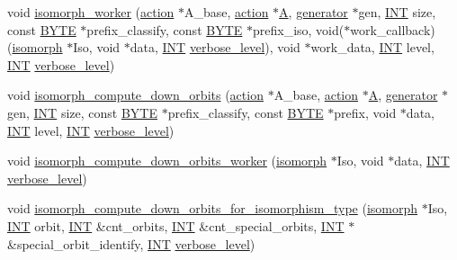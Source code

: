 \begin{DoxyCompactItemize}
void \mbox{\hyperlink{isomorph__global_8_c_ace3bb6ec719b02a35534309d4d3fe99a}{isomorph\+\_\+worker}} (\mbox{\hyperlink{classaction}{action}} $\ast$A\+\_\+base, \mbox{\hyperlink{classaction}{action}} $\ast$\mbox{\hyperlink{simeon_8_c_a97833f04c3a9c008df5521a2fc291bb4}{A}}, \mbox{\hyperlink{classgenerator}{generator}} $\ast$gen, \mbox{\hyperlink{galois_8h_a09fddde158a3a20bd2dcadb609de11dc}{I\+NT}} size, const \mbox{\hyperlink{galois_8h_ab6cc7b4aeb6ea31aba2b3fbfc83ff5e6}{B\+Y\+TE}} $\ast$prefix\+\_\+classify, const \mbox{\hyperlink{galois_8h_ab6cc7b4aeb6ea31aba2b3fbfc83ff5e6}{B\+Y\+TE}} $\ast$prefix\+\_\+iso, void($\ast$work\+\_\+callback)(\mbox{\hyperlink{classisomorph}{isomorph}} $\ast$Iso, void $\ast$data, \mbox{\hyperlink{galois_8h_a09fddde158a3a20bd2dcadb609de11dc}{I\+NT}} \mbox{\hyperlink{simeon_8_c_a818073fbcc2f439e7c56952f67386122}{verbose\+\_\+level}}), void $\ast$work\+\_\+data, \mbox{\hyperlink{galois_8h_a09fddde158a3a20bd2dcadb609de11dc}{I\+NT}} level, \mbox{\hyperlink{galois_8h_a09fddde158a3a20bd2dcadb609de11dc}{I\+NT}} \mbox{\hyperlink{simeon_8_c_a818073fbcc2f439e7c56952f67386122}{verbose\+\_\+level}})
\item 
void \mbox{\hyperlink{isomorph__global_8_c_a3613cea19158edd30958c4edecd97d53}{isomorph\+\_\+compute\+\_\+down\+\_\+orbits}} (\mbox{\hyperlink{classaction}{action}} $\ast$A\+\_\+base, \mbox{\hyperlink{classaction}{action}} $\ast$\mbox{\hyperlink{simeon_8_c_a97833f04c3a9c008df5521a2fc291bb4}{A}}, \mbox{\hyperlink{classgenerator}{generator}} $\ast$gen, \mbox{\hyperlink{galois_8h_a09fddde158a3a20bd2dcadb609de11dc}{I\+NT}} size, const \mbox{\hyperlink{galois_8h_ab6cc7b4aeb6ea31aba2b3fbfc83ff5e6}{B\+Y\+TE}} $\ast$prefix\+\_\+classify, const \mbox{\hyperlink{galois_8h_ab6cc7b4aeb6ea31aba2b3fbfc83ff5e6}{B\+Y\+TE}} $\ast$prefix, void $\ast$data, \mbox{\hyperlink{galois_8h_a09fddde158a3a20bd2dcadb609de11dc}{I\+NT}} level, \mbox{\hyperlink{galois_8h_a09fddde158a3a20bd2dcadb609de11dc}{I\+NT}} \mbox{\hyperlink{simeon_8_c_a818073fbcc2f439e7c56952f67386122}{verbose\+\_\+level}})
\item 
void \mbox{\hyperlink{isomorph__global_8_c_a4edf4a833ce5638a3d58cfae1c702b37}{isomorph\+\_\+compute\+\_\+down\+\_\+orbits\+\_\+worker}} (\mbox{\hyperlink{classisomorph}{isomorph}} $\ast$Iso, void $\ast$data, \mbox{\hyperlink{galois_8h_a09fddde158a3a20bd2dcadb609de11dc}{I\+NT}} \mbox{\hyperlink{simeon_8_c_a818073fbcc2f439e7c56952f67386122}{verbose\+\_\+level}})
\item 
void \mbox{\hyperlink{isomorph__global_8_c_a13519b3a5d3b5ceb26b4bec6736b0086}{isomorph\+\_\+compute\+\_\+down\+\_\+orbits\+\_\+for\+\_\+isomorphism\+\_\+type}} (\mbox{\hyperlink{classisomorph}{isomorph}} $\ast$Iso, \mbox{\hyperlink{galois_8h_a09fddde158a3a20bd2dcadb609de11dc}{I\+NT}} orbit, \mbox{\hyperlink{galois_8h_a09fddde158a3a20bd2dcadb609de11dc}{I\+NT}} \&cnt\+\_\+orbits, \mbox{\hyperlink{galois_8h_a09fddde158a3a20bd2dcadb609de11dc}{I\+NT}} \&cnt\+\_\+special\+\_\+orbits, \mbox{\hyperlink{galois_8h_a09fddde158a3a20bd2dcadb609de11dc}{I\+NT}} $\ast$\&special\+\_\+orbit\+\_\+identify, \mbox{\hyperlink{galois_8h_a09fddde158a3a20bd2dcadb609de11dc}{I\+NT}} \mbox{\hyperlink{simeon_8_c_a818073fbcc2f439e7c56952f67386122}{verbose\+\_\+level}})

\end{DoxyCompactItemize}
